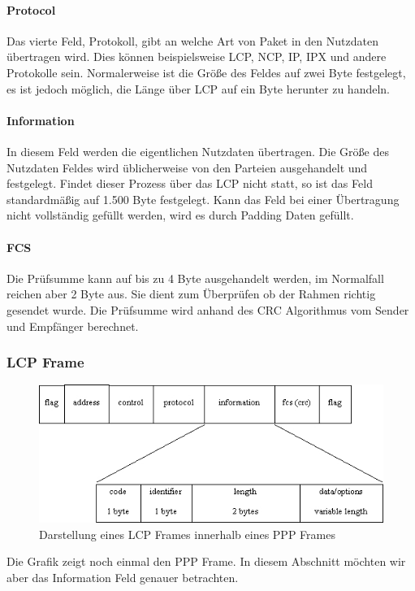 \documentclass[12pt, a4paper, ngerman]{article}
\begin{document}
\paragraph{Protocol}

Das vierte Feld, Protokoll, gibt an welche Art von Paket in den Nutzdaten übertragen wird. Dies können beispielsweise LCP, NCP, IP, IPX und andere Protokolle sein. Normalerweise ist die Größe des Feldes auf zwei Byte festgelegt, es ist jedoch möglich, die Länge über LCP auf ein Byte herunter zu handeln.


\paragraph{Information}

In diesem Feld werden die eigentlichen Nutzdaten übertragen. Die Größe des Nutzdaten Feldes wird üblicherweise von den Parteien ausgehandelt und festgelegt. Findet dieser Prozess über das LCP nicht statt, so ist das Feld standardmäßig auf 1.500 Byte festgelegt.
Kann das Feld bei einer Übertragung nicht vollständig gefüllt werden, wird es durch Padding Daten gefüllt.

\paragraph{FCS}

Die Prüfsumme kann auf bis zu 4 Byte ausgehandelt werden, im Normalfall reichen aber 2 Byte aus. Sie dient zum Überprüfen ob der Rahmen richtig gesendet wurde. Die Prüfsumme wird anhand des CRC Algorithmus vom Sender und Empfänger berechnet. 

\subsubsection{LCP Frame}
\begin{figure}[H]
	\centering
	\includegraphics[width=1\textwidth]{Grafiken/lcp-header.jpg}	
	\caption{Darstellung eines LCP Frames innerhalb eines PPP Frames}
\end{figure}
Die Grafik zeigt noch einmal den PPP Frame. In diesem Abschnitt möchten wir aber das Information Feld genauer betrachten.
\end{document}
